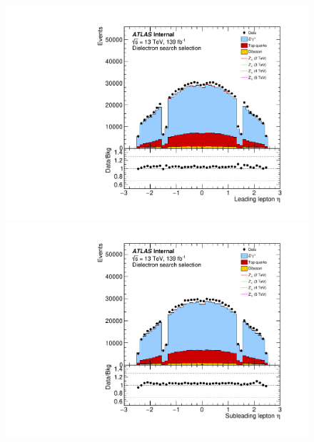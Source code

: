 \begin{figure}[h!]
\captionsetup[subfigure]{position=b}
\centering
\begin{minipage}[b]{.45\linewidth}
    \includegraphics[width=1\textwidth]{figures/ci/dataMc/stacks_mc16e_2015-2018_ee_eta1.pdf}
    \subcaption{}
\end{minipage} 
\begin{minipage}[b]{.45\linewidth}
    \includegraphics[width=1\textwidth]{figures/ci/dataMc/stacks_mc16e_2015-2018_ee_eta2.pdf}
    \subcaption{}
\end{minipage}\\
\begin{minipage}[b]{.45\linewidth}

\end{minipage}
\end{figure}
